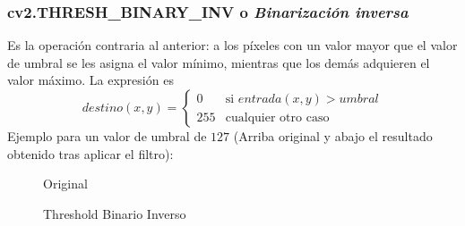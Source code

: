\subsubsection{cv2.THRESH\_BINARY\_INV o \emph{Binarización inversa}}
Es la operación contraria al anterior: a los píxeles con un valor
mayor que el valor de umbral se les asigna el valor mínimo, mientras
que los demás adquieren el valor máximo. La expresión es
\begin{equation*}
  destino(x, y) =
  \begin{cases}
    0 & \text{si } entrada(x, y) > umbral \\
    255 & \text{cualquier otro caso}
  \end{cases}
\end{equation*}
Ejemplo para un valor de umbral de $127$ (Arriba original y abajo el
resultado obtenido tras aplicar el filtro):

\begin{figure}[H]
  \caption{Original}
  \centering \setlength\fboxsep{0pt} \setlength\fboxrule{0.5pt}
\end{figure}

\begin{figure}[H]
  \centering \setlength\fboxsep{0pt} \setlength\fboxrule{0.5pt}
  \caption{Threshold Binario Inverso}
\end{figure}


